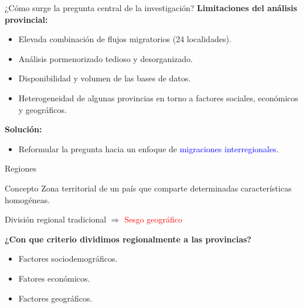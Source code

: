 \documentclass[11pt]{beamer}
\begin{document}
\begin{frame}[t]{¿Cómo surge la pregunta central de la investigación?}
\textbf{Limitaciones del análisis provincial:}
\begin{itemize}
\item Elevada combinación de flujos migratorios (24 localidades).
\vspace{0.5 cm}
\item Análisis pormenorizado tedioso y desorganizado.
 \vspace{0.5 cm}
 \item Disponibilidad y volumen de las bases de datos.
  \vspace{0.5 cm}
 \item Heterogeneidad de algunas provincias en torno a factores sociales, económicos y geográficos.
 
\end{itemize}
 \vspace{0.5 cm}

\textbf{Solución:}
 \begin{itemize}
\item Reformular la pregunta hacia un enfoque de \textcolor{blue}{migraciones interregionales}.
\end{itemize}


\end{frame}



\begin{frame}[t]{Regiones}
\begin{block}{Concepto}
Zona territorial de un país que comparte determinadas características homogéneas.
\end{block}
\begin{center}
 División regional tradicional $\Longrightarrow$ \textcolor{red}{Sesgo geográfico}
\end{center}
\vspace{0.5 cm}
\textbf{¿Con que criterio dividimos regionalmente a las provincias?}
\begin{itemize}
\item Factores sociodemográficos.
\vspace{0.5 cm}
\item Fatores económicos.
 \vspace{0.5 cm}
 \item Factores geográficos.
 
\end{itemize}
 \vspace{0.5 cm}

\end{frame}
\end{document}
